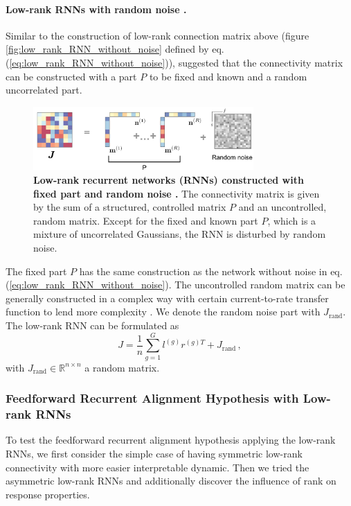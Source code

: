 \documentclass[11pt]{article}
\begin{document}
{	\paragraph{Low-rank RNNs with random noise \cite{mastrogiuseppe2018linking}.}
	Similar to the construction of low-rank connection matrix above (figure \ref{fig:low_rank_RNN_without_noise} defined by eq.(\ref{eq:low_rank_RNN_without_noise})), \cite{mastrogiuseppe2018linking} suggested that the connectivity matrix can be constructed with a part $P$ to be fixed and known and a random uncorrelated part.
		\begin{figure} [H]
			\centering
			\includegraphics[width=0.75\textwidth]{../figures/low_rank_RNN_with_noise.pdf}
			\caption{\textbf{Low-rank recurrent networks (RNNs) constructed with fixed part and random noise \cite{mastrogiuseppe2018linking}.} The connectivity matrix is given by the sum of a structured, controlled matrix $P$ and an uncontrolled, random matrix. Except for the fixed and known part $P$, which is a mixture of uncorrelated Gaussians, the RNN is disturbed by random noise.}
			\label{fig:low_rank_RNN_with_noise}
		\end{figure}
	The fixed part $P$ has the same construction as the network without noise in eq.(\ref{eq:low_rank_RNN_without_noise}). The uncontrolled random matrix can be generally constructed in a complex way with certain current-to-rate transfer function to lend more complexity \cite{mastrogiuseppe2018linking}. We denote the random noise part with $J_{\text{rand}}$. The low-rank RNN can be formulated as
		\begin{equation} \label{eq:low_rank_with_noise}
			J = \frac{1}{n} \sum_{g=1}^{G} l^{(g)} r^{(g)T} + J_{\text{rand}} \, ,
		\end{equation}
	with $J_{\text{rand}} \in \mathbb{R}^{n \times n}$ a random matrix. 
	
	\subsubsection{Feedforward Recurrent Alignment Hypothesis with Low-rank RNNs} \label{sec:ffrec_low_rank}
	To test the feedforward recurrent alignment hypothesis applying the low-rank RNNs, we first consider the simple case of having symmetric low-rank connectivity with more easier interpretable dynamic. Then we tried the asymmetric low-rank RNNs and additionally discover the influence of rank on response properties. 
	
}
\end{document}

